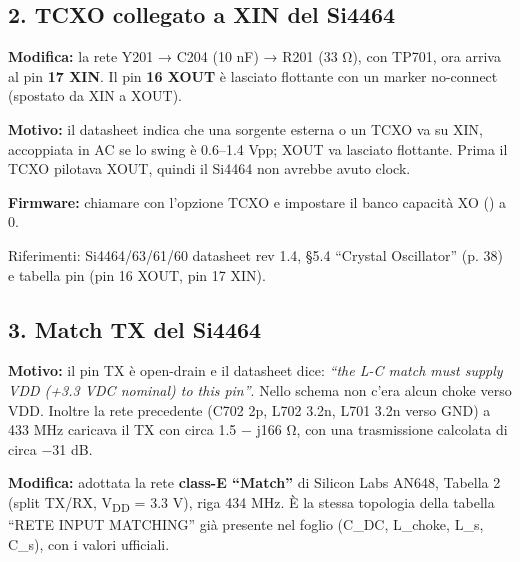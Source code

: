 \subsection[2. TCXO collegato a XIN del Si4464]{2. TCXO collegato a XIN del Si4464 }

\textbf{Modifica:} la rete Y201 → C204 (10 nF) → R201 (33 Ω), con TP701, ora arriva al pin \textbf{17 XIN}. Il pin \textbf{16 XOUT} è lasciato flottante con un marker no-connect (spostato da XIN a XOUT).

\textbf{Motivo:} il datasheet indica che una sorgente esterna o un TCXO va su XIN, accoppiata in AC se lo swing è 0.6–1.4 Vpp; XOUT va lasciato flottante. Prima il TCXO pilotava XOUT, quindi il Si4464 non avrebbe avuto clock.

\textbf{Firmware:} chiamare  con l'opzione TCXO e impostare il banco capacità XO () a 0.

{\small Riferimenti: Si4464/\allowbreak{}63/\allowbreak{}61/\allowbreak{}60 datasheet rev 1.4, §5.4 \textquotedblleft{}Crystal Oscillator\textquotedblright{} (p. 38) e tabella pin (pin 16 XOUT, pin 17 XIN).}

\subsection[3. Match TX del Si4464]{3. Match TX del Si4464 }

\textbf{Motivo:} il pin TX è open-drain e il datasheet dice: \textit{\textquotedblleft{}the L-C match must supply VDD (+3.3 VDC nominal) to this pin\textquotedblright{}}. Nello schema non c'era alcun choke verso VDD. Inoltre la rete precedente (C702 2p, L702 3.2n, L701 3.2n verso GND) a 433 MHz caricava il TX con circa 1.5 − j166 Ω, con una trasmissione calcolata di circa −31 dB.

\textbf{Modifica:} adottata la rete \textbf{class-E \textquotedblleft{}Match\textquotedblright{}} di Silicon Labs AN648, Tabella 2 (split TX/\allowbreak{}RX, V\textsubscript{DD} = 3.3 V), riga 434 MHz. È la stessa topologia della tabella \textquotedblleft{}RETE INPUT MATCHING\textquotedblright{} già presente nel foglio (C\_\allowbreak{}DC, L\_\allowbreak{}choke, L\_\allowbreak{}s, C\_\allowbreak{}s), con i valori ufficiali.


